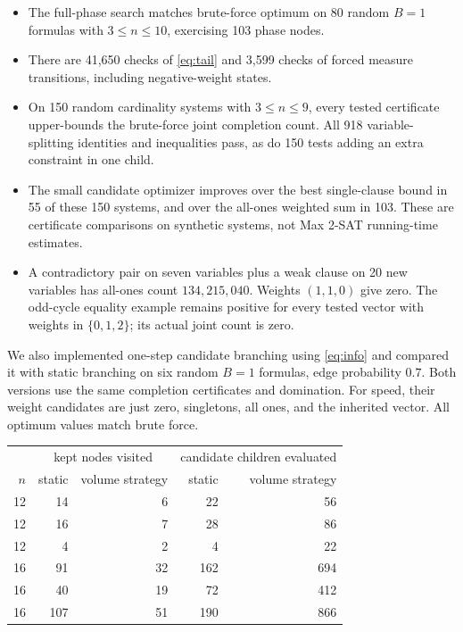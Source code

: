 \documentclass[11pt,a4paper]{article}
\theoremstyle{remark}
\begin{document}
\begin{itemize}
\item The full-phase search matches brute-force optimum on 80 random
$B=1$ formulas with $3\le n\le10$, exercising 103 phase nodes.
\item There are 41,650 checks of \eqref{eq:tail} and 3,599 checks of forced
measure transitions, including negative-weight states.
\item On 150 random cardinality systems with $3\le n\le9$, every tested
certificate upper-bounds the brute-force joint completion count. All 918
variable-splitting identities and inequalities pass, as do 150 tests adding
an extra constraint in one child.
\item The small candidate optimizer improves over the best single-clause
bound in 55 of these 150 systems, and over the all-ones weighted sum in 103.
These are certificate comparisons on synthetic systems, not Max 2-SAT
running-time estimates.
\item A contradictory pair on seven variables plus a weak clause on 20 new
variables has all-ones count $134{,}215{,}040$. Weights $(1,1,0)$ give zero.
The odd-cycle equality example remains positive for every tested vector
with weights in $\{0,1,2\}$; its actual joint count is zero.
\end{itemize}

We also implemented one-step candidate branching using \eqref{eq:info} and
compared it with static branching on six random $B=1$ formulas, edge
probability $0.7$. Both versions use the same completion certificates and
domination. For speed, their weight candidates are just zero, singletons,
all ones, and the inherited vector. All optimum values match brute force.

\begin{center}
\begin{tabular}{rrrrr}
\toprule
& \multicolumn{2}{c}{kept nodes visited}
& \multicolumn{2}{c}{candidate children evaluated}\\
$n$ & static & volume strategy & static & volume strategy\\
\midrule
12 & 14 & 6 & 22 & 56\\
12 & 16 & 7 & 28 & 86\\
12 & 4 & 2 & 4 & 22\\
16 & 91 & 32 & 162 & 694\\
16 & 40 & 19 & 72 & 412\\
16 & 107 & 51 & 190 & 866\\
\bottomrule
\end{tabular}
\end{center}
\end{document}

